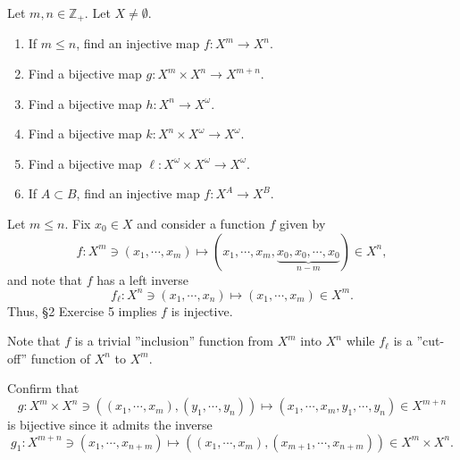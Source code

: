 \documentclass[a4paper,12pt]{article}
\begin{document}
\begin{exe}
	Let \( m,n \in \mathbb{Z}_{+} \).
	Let \( X \neq \emptyset \).
	\begin{enumerate}
		\item
		      If \( m \le n \), find an injective map \( f:X^m \to X^n \).
		      
		\item
		      Find a bijective map \( g:X^m \times X^n \to X^{m+n} \).
		      
		\item
		      Find a bijective map \( h:X^n \to X^{\omega} \).
		      
		\item
		      Find a bijective map \( k:X^n \times X^{\omega} \to X^{\omega} \).
		      
		\item
		      Find a bijective map \( \ell:X^{\omega} \times X^{\omega} \to X^{\omega} \).
		      
		\item
		      If \( A \subset B \), find an injective map \( f:X^A \to X^B \).
	\end{enumerate}
\end{exe}\begin{sol}\leavevmode \par
	Let
	\( m \le n \).
	Fix
	\( x_0 \in X \)
	and consider a function \( f \) given by
	\begin{equation*}
		f:X^m \ni (x_1,\cdots,x_m)
		\mapsto
		(x_1,\cdots,x_m,\underbrace{x_0,x_0,\cdots,x_0}_{n-m}) \in X^n,
	\end{equation*}
	and note that \( f \) has a left inverse
	\begin{equation*}
		f_{\ell}:X^n \ni (x_1,\cdots,x_n)
		\mapsto
		(x_1,\cdots,x_m) \in X^m.
	\end{equation*}
	Thus, \S2 Exercise 5 implies
	\( f \)
	is injective.
	
	Note that \( f \) is a trivial ''inclusion'' function from \( X^m \) into \( X^n \)
	while \( f_{\ell} \) is a ''cut-off'' function of \( X^n \) to \( X^m \).
	
	Confirm that
	\begin{equation*}
		g:X^m \times X^n \ni
		((x_1,\cdots,x_m),(y_1,\cdots,y_n))
		\mapsto
		(x_1,\cdots,x_m,y_1,\cdots,y_n)
		\in X^{m+n}
	\end{equation*}
	is bijective since it admits the inverse
	\begin{equation*}
		g_1:X^{m+n} \ni
		(x_1,\cdots,x_{n+m})
		\mapsto
		((x_1,\cdots,x_m),(x_{m+1},\cdots,x_{n+m}))
		\in X^m \times X^n.
	\end{equation*}
	

\end{sol}
\end{document}
